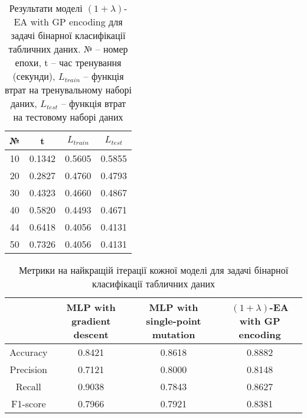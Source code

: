 \begin{table}[ht]
	\centering
	\begin{adjustbox}{max width=\textwidth}
		\begin{tabular}{|c|c|c|c|}
			\hline 
			№ & t & $L_{train}$ & $L_{test}$ \\
			\hline 
			10 & 0.1342 & 0.5605 & 0.5855 \\
			\hline 
			20 & 0.2827 & 0.4760 & 0.4793 \\
			\hline
			30 & 0.4323 & 0.4660 & 0.4867 \\
			\hline
			40 & 0.5820 & 0.4493 & 0.4671 \\
			\hline
			44 & 0.6418 & 0.4056 & 0.4131 \\
			\hline
			50 & 0.7326 & 0.4056 & 0.4131 \\
			\hline
		\end{tabular}
	\end{adjustbox}
	\caption{Результати моделі $(1+\lambda)$-EA with GP encoding для задачі бінарної класифікації табличних даних. № -- номер епохи, t -- час тренування (секунди), $L_{train}$ -- функція втрат на тренувальному наборі даних, $L_{test}$ -- функція втрат на тестовому наборі даних}
	\label{ea_bc_td_results}
\end{table}

\begin{table}[ht]
	\centering
	\begin{adjustbox}{max width=\textwidth}
		\begin{tabular}{|c|c|c|c|}
			\hline 
			 & MLP with gradient descent & MLP with single-point mutation & $(1+\lambda)$-EA with GP encoding \\
			\hline 
			Accuracy & 0.8421 & 0.8618 & 0.8882 \\
			\hline 
			Precision & 0.7121 & 0.8000 & 0.8148 \\
			\hline
			Recall & 0.9038 & 0.7843 & 0.8627 \\
			\hline
			F1-score & 0.7966 & 0.7921 & 0.8381 \\
			\hline
		\end{tabular}
	\end{adjustbox}
	\caption{Метрики на найкращій ітерації кожної моделі для задачі бінарної класифікації табличних даних}
	\label{metrics_bc_td_results}
\end{table}

